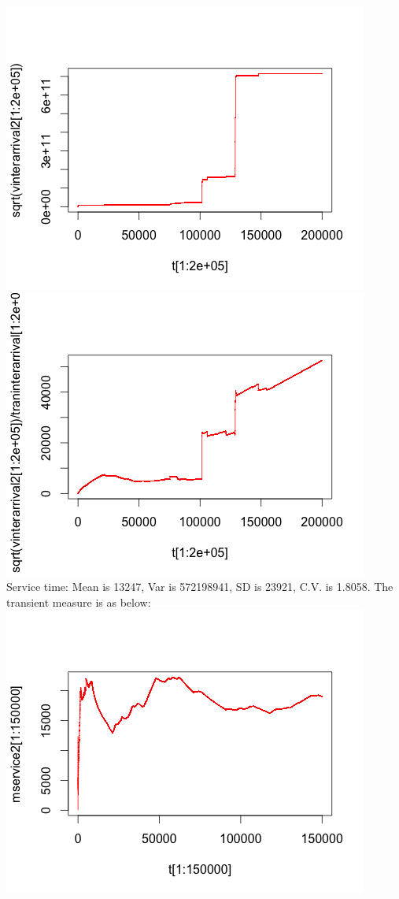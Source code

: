 \documentclass[11pt]{article}
\begin{document}
\includegraphics[scale=0.5]{SDinterarrival2.png}
\includegraphics[scale=0.5]{CVinterarrival2.png} \\
Service time: Mean is 13247, Var is 572198941, SD is 23921, C.V. is 1.8058. The transient measure is as below: \\
\includegraphics[scale=0.5]{mservice2.png}
\end{document}
